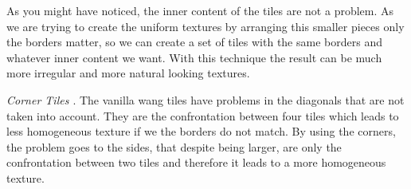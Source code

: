 
As you might have noticed, the inner content of the tiles are not a problem. As we are trying to create the uniform textures by arranging this smaller pieces only the borders matter, so we can create a set of tiles with the same borders and whatever inner content we want. With this technique the result can be much more irregular and more natural looking textures.


\emph{Corner Tiles \cite{LD06AWTCECC}}. The vanilla wang tiles have problems in the diagonals that are not taken into account. They are the confrontation between four tiles which leads to less homogeneous texture if we the borders do not match. By using the corners, the problem goes to the sides, that despite being larger, are only the confrontation between two tiles and therefore it leads to a more homogeneous texture.






